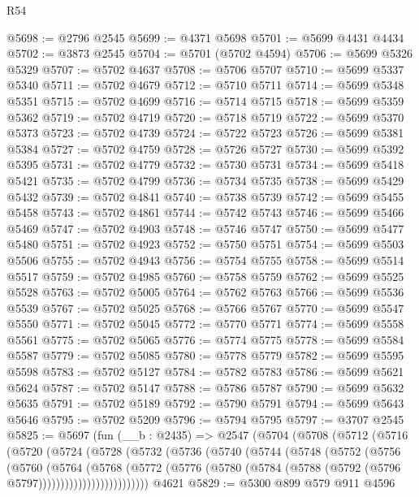 \begin{lexlean}{R54}
\begin{coremodule}
@5698 := @2796 @2545
@5699 := @4371 @5698
@5701 := @5699 @4431 @4434
@5702 := @3873 @2545
@5704 := @5701 (@5702 @4594)
@5706 := @5699 @5326 @5329
@5707 := @5702 @4637
@5708 := @5706 @5707
@5710 := @5699 @5337 @5340
@5711 := @5702 @4679
@5712 := @5710 @5711
@5714 := @5699 @5348 @5351
@5715 := @5702 @4699
@5716 := @5714 @5715
@5718 := @5699 @5359 @5362
@5719 := @5702 @4719
@5720 := @5718 @5719
@5722 := @5699 @5370 @5373
@5723 := @5702 @4739
@5724 := @5722 @5723
@5726 := @5699 @5381 @5384
@5727 := @5702 @4759
@5728 := @5726 @5727
@5730 := @5699 @5392 @5395
@5731 := @5702 @4779
@5732 := @5730 @5731
@5734 := @5699 @5418 @5421
@5735 := @5702 @4799
@5736 := @5734 @5735
@5738 := @5699 @5429 @5432
@5739 := @5702 @4841
@5740 := @5738 @5739
@5742 := @5699 @5455 @5458
@5743 := @5702 @4861
@5744 := @5742 @5743
@5746 := @5699 @5466 @5469
@5747 := @5702 @4903
@5748 := @5746 @5747
@5750 := @5699 @5477 @5480
@5751 := @5702 @4923
@5752 := @5750 @5751
@5754 := @5699 @5503 @5506
@5755 := @5702 @4943
@5756 := @5754 @5755
@5758 := @5699 @5514 @5517
@5759 := @5702 @4985
@5760 := @5758 @5759
@5762 := @5699 @5525 @5528
@5763 := @5702 @5005
@5764 := @5762 @5763
@5766 := @5699 @5536 @5539
@5767 := @5702 @5025
@5768 := @5766 @5767
@5770 := @5699 @5547 @5550
@5771 := @5702 @5045
@5772 := @5770 @5771
@5774 := @5699 @5558 @5561
@5775 := @5702 @5065
@5776 := @5774 @5775
@5778 := @5699 @5584 @5587
@5779 := @5702 @5085
@5780 := @5778 @5779
@5782 := @5699 @5595 @5598
@5783 := @5702 @5127
@5784 := @5782 @5783
@5786 := @5699 @5621 @5624
@5787 := @5702 @5147
@5788 := @5786 @5787
@5790 := @5699 @5632 @5635
@5791 := @5702 @5189
@5792 := @5790 @5791
@5794 := @5699 @5643 @5646
@5795 := @5702 @5209
@5796 := @5794 @5795
@5797 := @3707 @2545
@5825 := @5697
    (fun (__b : @2435) =>
    @2547
      (@5704
        (@5708
          (@5712
            (@5716
              (@5720
                (@5724
                  (@5728
                    (@5732
                      (@5736
                        (@5740
                          (@5744
                            (@5748
                              (@5752
                                (@5756
                                  (@5760
                                    (@5764
                                      (@5768
                                        (@5772
                                          (@5776
                                            (@5780
                                              (@5784
                                                (@5788 (@5792 (@5796 @5797)))))))))))))))))))))))))
    @4621
@5829 := @5300 @899 @579 @911 @4596

\end{coremodule}
\end{lexlean}
